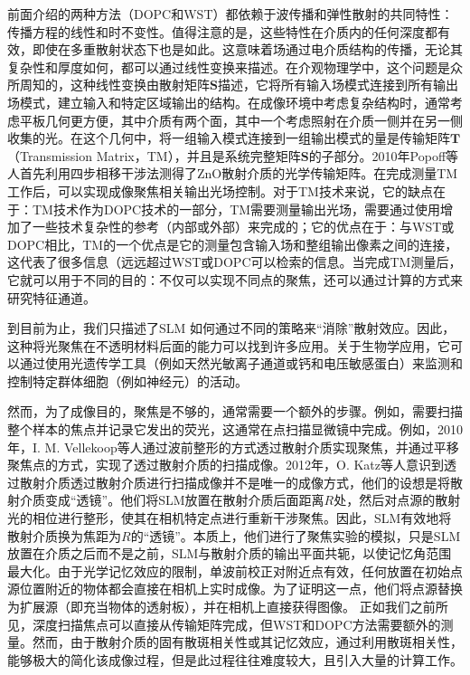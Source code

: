 前面介绍的两种方法（DOPC和WST）都依赖于波传播和弹性散射的共同特性：传播方程的线性和时不变性。值得注意的是，这些特性在介质内的任何深度都有效，即使在多重散射状态下也是如此。这意味着场通过电介质结构的传播，无论其复杂性和厚度如何，都可以通过线性变换来描述。在介观物理学中，这个问题是众所周知的，这种线性变换由散射矩阵$\mathbf{S}$描述，它将所有输入场模式连接到所有输出场模式，建立输入和特定区域输出的结构。在成像环境中考虑复杂结构时，通常考虑平板几何更方便，其中介质有两个面，其中一个考虑照射在介质一侧并在另一侧收集的光。在这个几何中，将一组输入模式连接到一组输出模式的量是传输矩阵$\mathbf{T}$（Transmission Matrix，TM），并且是系统完整矩阵$\mathbf{S}$的子部分。2010年Popoff等人\cite{Popoff2010}首先利用四步相移干涉法测得了ZnO散射介质的光学传输矩阵。在完成测量TM工作后，可以实现成像聚焦相关输出光场控制。对于TM技术来说，它的缺点在于：TM技术作为DOPC技术的一部分，TM需要测量输出光场，需要通过使用增加了一些技术复杂性的参考（内部或外部）来完成的；它的优点在于：与WST或DOPC相比，TM的一个优点是它的测量包含输入场和整组输出像素之间的连接，这代表了很多信息（远远超过WST或DOPC可以检索的信息。当完成TM测量后，它就可以用于不同的目的：不仅可以实现不同点的聚焦，还可以通过计算的方式来研究特征通道。

到目前为止，我们只描述了SLM 如何通过不同的策略来“消除”散射效应。因此，这种将光聚焦在不透明材料后面的能力可以找到许多应用。关于生物学应用，它可以通过使用光遗传学工具（例如天然光敏离子通道或钙和电压敏感蛋白）来监测和控制特定群体细胞（例如神经元）的活动。

然而，为了成像目的，聚焦是不够的，通常需要一个额外的步骤。例如，需要扫描整个样本的焦点并记录它发出的荧光，这通常在点扫描显微镜中完成。例如，2010年，I. M. Vellekoop等人\cite{vellekoop_scattered_2010}通过波前整形的方式透过散射介质实现聚焦，并通过平移聚焦点的方式，实现了透过散射介质的扫描成像。2012年，O. Katz等人\cite{katz_looking_2012}意识到透过散射介质透过散射介质进行扫描成像并不是唯一的成像方式，他们的设想是将散射介质变成“透镜”。他们将SLM放置在散射介质后面距离$R$处，然后对点源的散射光的相位进行整形，使其在相机特定点进行重新干涉聚焦。因此，SLM有效地将散射介质换为焦距为$R$的“透镜”。本质上，他们进行了聚焦实验的模拟，只是SLM放置在介质之后而不是之前，SLM与散射介质的输出平面共轭，以使记忆角范围最大化。由于光学记忆效应的限制，单波前校正对附近点有效，任何放置在初始点源位置附近的物体都会直接在相机上实时成像。为了证明这一点，他们将点源替换为扩展源（即充当物体的透射板），并在相机上直接获得图像。
正如我们之前所见，深度扫描焦点可以直接从传输矩阵完成，但WST和DOPC方法需要额外的测量。然而，由于散射介质的固有散斑相关性或其记忆效应，通过利用散斑相关性，能够极大的简化该成像过程，但是此过程往往难度较大，且引入大量的计算工作。


